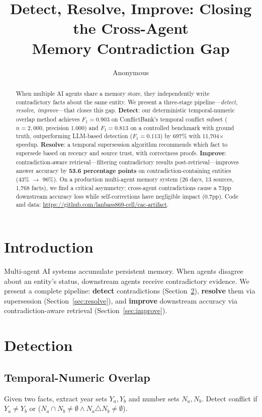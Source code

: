 \documentclass{article}
\title{Detect, Resolve, Improve: Closing the Cross-Agent\\Memory Contradiction Gap}
\author{Anonymous}
\date{}
\begin{document}
\maketitle

\begin{abstract}
When multiple AI agents share a memory store, they independently write contradictory facts about the same entity. We present a three-stage pipeline—\emph{detect, resolve, improve}—that closes this gap. \textbf{Detect}: our deterministic temporal-numeric overlap method achieves $F_1 = 0.903$ on ConflictBank's temporal conflict subset ($n{=}2{,}000$, precision 1.000) and $F_1 = 0.813$ on a controlled benchmark with ground truth, outperforming LLM-based detection ($F_1 = 0.113$) by 697\% with 11{,}704$\times$ speedup. \textbf{Resolve}: a temporal supersession algorithm recommends which fact to supersede based on recency and source trust, with correctness proofs. \textbf{Improve}: contradiction-aware retrieval—filtering contradictory results post-retrieval—improves answer accuracy by \textbf{53.6 percentage points} on contradiction-containing entities (43\% $\to$ 96\%). On a production multi-agent memory system (26 days, 13 sources, 1{,}768 facts), we find a critical asymmetry: cross-agent contradictions cause a 73pp downstream accuracy loss while self-corrections have negligible impact (0.7pp). Code and data: \url{https://github.com/lanbass869-cell/cac-artifact}.
\end{abstract}

\section{Introduction}

Multi-agent AI systems accumulate persistent memory. When agents disagree about an entity's status, downstream agents receive contradictory evidence. We present a complete pipeline: \textbf{detect} contradictions (Section~\ref{sec:detect}), \textbf{resolve} them via supersession (Section~\ref{sec:resolve}), and \textbf{improve} downstream accuracy via contradiction-aware retrieval (Section~\ref{sec:improve}).

\section{Detection}
\label{sec:detect}

\subsection{Temporal-Numeric Overlap}
Given two facts, extract year sets $Y_a, Y_b$ and number sets $N_a, N_b$. Detect conflict if $Y_a \neq Y_b$ or ($N_a \cap N_b \neq \emptyset \wedge N_a \triangle N_b \neq \emptyset$).
\end{document}
